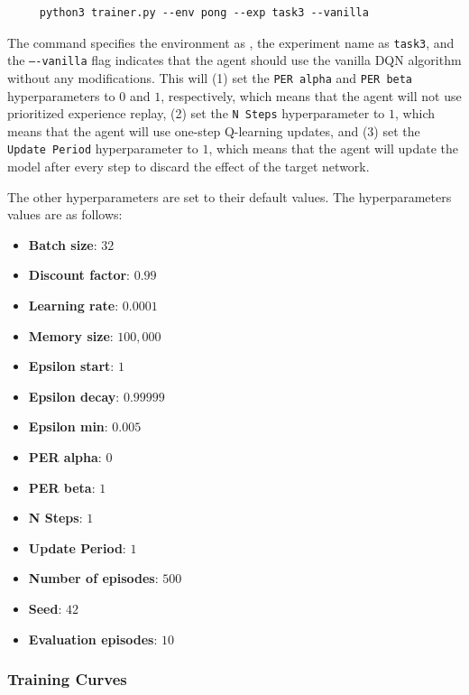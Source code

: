 \begin{verbatim}
     python3 trainer.py --env pong --exp task3 --vanilla
\end{verbatim}

The command specifies the environment as \pong, the experiment name as \texttt{task3}, and the \texttt{----vanilla} flag indicates that the agent should use the vanilla DQN algorithm without any modifications. This will (1) set the \texttt{PER alpha} and \texttt{PER beta} hyperparameters to $0$ and $1$, respectively, which means that the agent will not use prioritized experience replay, (2) set the \texttt{N Steps} hyperparameter to $1$, which means that the agent will use one-step Q-learning updates, and (3) set the \texttt{Update Period} hyperparameter to $1$, which means that the agent will update the model after every step to discard the effect of the target network.

The other hyperparameters are set to their default values.
The hyperparameters values are as follows:
\begin{itemize}
    \item \textbf{Batch size}: $32$
    \item \textbf{Discount factor}: $0.99$
    \item \textbf{Learning rate}: $0.0001$
    \item \textbf{Memory size}: $100,000$
    \item \textbf{Epsilon start}: $1$
    \item \textbf{Epsilon decay}: $0.99999$
    \item \textbf{Epsilon min}: $0.005$
    \item \textbf{PER alpha}: $0$
    \item \textbf{PER beta}: $1$
    \item \textbf{N Steps}: $1$
    \item \textbf{Update Period}: $1$
    \item \textbf{Number of episodes}: $500$
    \item \textbf{Seed}: $42$
    \item \textbf{Evaluation episodes}: $10$
\end{itemize}

\subsubsection{Training Curves}


